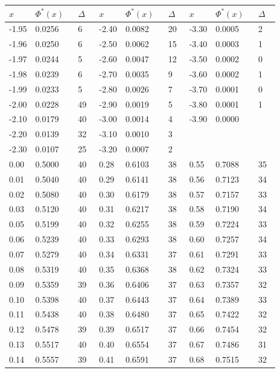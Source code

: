 \documentclass[russian, 12pt, fleqn,x11names]{article}
\begin{document}
\begin{center}
\begin{tabular}[b]{ | l | l |  l || l | l | l || l | l | l |   }
\hline
$x\ \ \ \ \ $&$\Phi^*(x)\ \ \ $&$\Delta\ \ \ $&$x\ \ \ \ \ $&$\Phi^*(x)\ \ \ $&$\Delta\ \ \ $&$x\ \ \ \ \ $&$\Phi^*(x)\ \ \ $&$\Delta\ \ \ $\\
\hline

-1.95&0.0256&6      &-2.40&0.0082&20      &-3.30&0.0005&2\\
-1.96&0.0250&6      &-2.50&0.0062&15	  &-3.40&0.0003&1  \\
-1.97&0.0244&5	    &-2.60&0.0047&12 	  &-3.50&0.0002&0 \\
-1.98&0.0239&6      &-2.70&0.0035&9	  &-3.60&0.0002&1\\
-1.99&0.0233&5      &-2.80&0.0026&7	  &-3.70&0.0001&0\\
-2.00&0.0228&49	    &-2.90&0.0019&5       &-3.80&0.0001&1 \\
-2.10&0.0179&40	    &-3.00&0.0014&4	  &-3.90&0.0000& \\
-2.20&0.0139&32     &-3.10&0.0010&3       & & & \\
-2.30&0.0107&25     &-3.20&0.0007&2         & & & \\
\hline
0.00&0.5000&40      &0.28&0.6103&38  &  0.55&0.7088&35\\%
0.01&0.5040&40	  &0.29&0.6141&38	 &  0.56&0.7123&34\\%
0.02&0.5080&40      &0.30&0.6179&38  &  0.57&0.7157&33\\%
0.03&0.5120&40      &0.31&0.6217&38	 &  0.58&0.7190&34\\%
0.05&0.5199&40	 &0.32&0.6255&38  &  0.59&0.7224&33\\%
0.06&0.5239&40      &0.33&0.6293&38	 &  0.60&0.7257&34\\%
0.07&0.5279&40	 &0.34&0.6331&37	 &  0.61&0.7291&33\\%
0.08&0.5319&40 	 &0.35&0.6368&38	 &  0.62&0.7324&33\\%
0.09&0.5359&39      &0.36&0.6406&37	 &  0.63&0.7357&32\\%
0.10&0.5398&40	 &0.37&0.6443&37	 &  0.64&0.7389&33\\%
0.11&0.5438&40	 &0.38&0.6480&37	 &  0.65&0.7422&32\\%
0.12&0.5478&39      &0.39&0.6517&37	 &  0.66&0.7454&32\\%
0.13&0.5517&40      &0.40&0.6554&37	 &  0.67&0.7486&31\\%
0.14&0.5557&39      &0.41&0.6591&37  &  0.68&0.7515&32\\%

\end{tabular}
\end{center}
\end{document}
